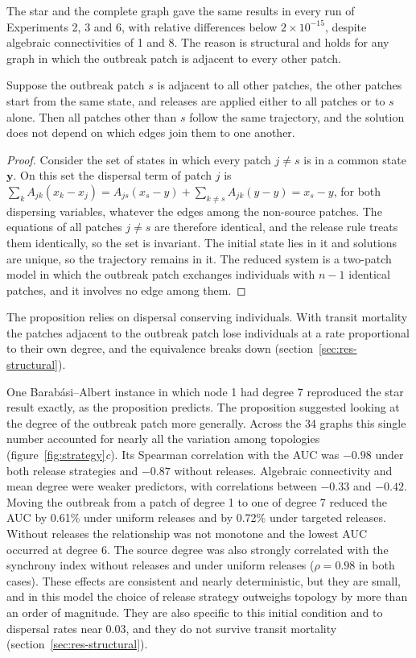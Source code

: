 The star and the complete graph gave the same results in every run of Experiments 2, 3 and 6, with relative differences below $2\times10^{-15}$, despite algebraic connectivities of 1 and 8. The reason is structural and holds for any graph in which the outbreak patch is adjacent to every other patch.

\begin{proposition}
\label{prop:hub}
Suppose the outbreak patch $s$ is adjacent to all other patches, the other patches start from the same state, and releases are applied either to all patches or to $s$ alone. Then all patches other than $s$ follow the same trajectory, and the solution does not depend on which edges join them to one another.
\end{proposition}

\begin{proof}
Consider the set of states in which every patch $j \neq s$ is in a common state $\mathbf{y}$. On this set the dispersal term of patch $j$ is $\sum_{k} A_{jk}(x_k - x_j) = A_{js}(x_s - y) + \sum_{k\neq s}A_{jk}(y - y) = x_s - y$, for both dispersing variables, whatever the edges among the non-source patches. The equations of all patches $j\neq s$ are therefore identical, and the release rule treats them identically, so the set is invariant. The initial state lies in it and solutions are unique, so the trajectory remains in it. The reduced system is a two-patch model in which the outbreak patch exchanges individuals with $n-1$ identical patches, and it involves no edge among them.
\end{proof}

The proposition relies on dispersal conserving individuals. With transit mortality the patches adjacent to the outbreak patch lose individuals at a rate proportional to their own degree, and the equivalence breaks down (section~\ref{sec:res-structural}).

One Barab\'asi--Albert instance in which node 1 had degree 7 reproduced the star result exactly, as the proposition predicts. The proposition suggested looking at the degree of the outbreak patch more generally. Across the 34 graphs this single number accounted for nearly all the variation among topologies (figure~\ref{fig:strategy}\emph{c}). Its Spearman correlation with the AUC was $-0.98$ under both release strategies and $-0.87$ without releases. Algebraic connectivity and mean degree were weaker predictors, with correlations between $-0.33$ and $-0.42$. Moving the outbreak from a patch of degree 1 to one of degree 7 reduced the AUC by 0.61\% under uniform releases and by 0.72\% under targeted releases. Without releases the relationship was not monotone and the lowest AUC occurred at degree 6. The source degree was also strongly correlated with the synchrony index without releases and under uniform releases ($\rho = 0.98$ in both cases). These effects are consistent and nearly deterministic, but they are small, and in this model the choice of release strategy outweighs topology by more than an order of magnitude. They are also specific to this initial condition and to dispersal rates near 0.03, and they do not survive transit mortality (section~\ref{sec:res-structural}).

